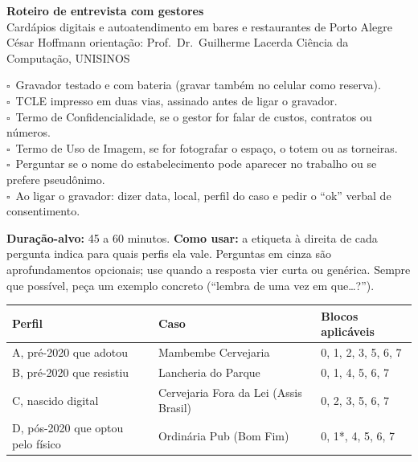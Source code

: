 \documentclass[11pt,a4paper]{article}
\newcommand{\caixa}{$\square$\ }
\begin{document}
\begin{center}
  {\Large\bfseries Roteiro de entrevista com gestores}\\[0.4em]
  Cardápios digitais e autoatendimento em bares e restaurantes de Porto Alegre\\[0.2em]
  {\small César Hoffmann \textbullet{} orientação: Prof.\ Dr.\ Guilherme Lacerda \textbullet{} Ciência da Computação, UNISINOS}
\end{center}

\begin{tcolorbox}[colback=gray!6,colframe=gray!50,title=Antes de começar,fonttitle=\bfseries]
\caixa Gravador testado e com bateria (gravar também no celular como reserva).\\
\caixa TCLE impresso em duas vias, assinado antes de ligar o gravador.\\
\caixa Termo de Confidencialidade, se o gestor for falar de custos, contratos ou números.\\
\caixa Termo de Uso de Imagem, se for fotografar o espaço, o totem ou as torneiras.\\
\caixa Perguntar se o nome do estabelecimento pode aparecer no trabalho ou se prefere pseudônimo.\\
\caixa Ao ligar o gravador: dizer data, local, perfil do caso e pedir o ``ok'' verbal de consentimento.
\end{tcolorbox}

\textbf{Duração-alvo:} 45 a 60 minutos. \textbf{Como usar:} a etiqueta à direita de cada pergunta indica para quais perfis ela vale. Perguntas em cinza são aprofundamentos opcionais; use quando a resposta vier curta ou genérica. Sempre que possível, peça um exemplo concreto (``lembra de uma vez em que\ldots?'').

\begin{center}
\small
\begin{tabular}{lll}
  \toprule
  \textbf{Perfil} & \textbf{Caso} & \textbf{Blocos aplicáveis} \\
  \midrule
  A, pré-2020 que adotou & Mambembe Cervejaria & 0, 1, 2, 3, 5, 6, 7 \\
  B, pré-2020 que resistiu & Lancheria do Parque & 0, 1, 4, 5, 6, 7 \\
  C, nascido digital & Cervejaria Fora da Lei (Assis Brasil) & 0, 2, 3, 5, 6, 7 \\
  D, pós-2020 que optou pelo físico & Ordinária Pub (Bom Fim) & 0, 1*, 4, 5, 6, 7 \\
  \bottomrule
\end{tabular}
\end{center}
\end{document}
